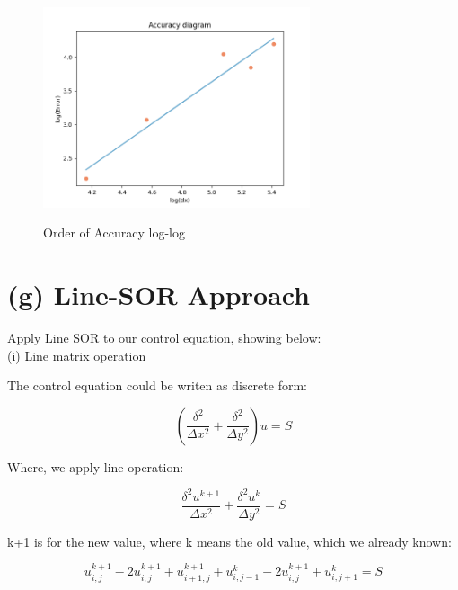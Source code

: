 \documentclass[12pt]{article}
\begin{document}
\begin{figure}[H]
    \centering
    \includegraphics[width=0.7\textwidth]{4cyOrderofAccuracy.png}
    \label{4cyOrderofAccuracy.png}
    \caption{Order of Accuracy log-log}
\end{figure}

















\section{(g) Line-SOR Approach}
Apply Line SOR to our control equation, showing below:\\


(i) Line matrix operation


The control equation could be writen as discrete form:

\begin{equation*}
\left( \frac{\delta^2}{\Delta x^2} + \frac{\delta^2}{\Delta y^2} \right) u = S
\end{equation*}


Where, we apply line operation:

\begin{equation*}
\frac{\delta^2 u^{k+1}}{\Delta x^2} + \frac{\delta^2 u^k}{\Delta y^2} = S
\end{equation*}

k+1 is for the new value, where k means the old value, which we already known:


\begin{equation*}
u_{i,j}^{k+1} - 2u_{i,j}^{k+1} + u_{i+1,j}^{k+1} + u_{i,j-1}^{k} - 2u_{i,j}^{k+1} + u_{i,j+1}^{k} = S
\end{equation*}
\end{document}
